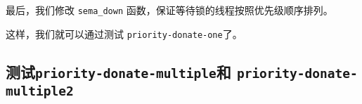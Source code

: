 \documentclass{beamer}
\begin{document}
\begin{frame}
      


\vspace{1em}



  最后，我们修改 \texttt{sema\_down} 函数，保证等待锁的线程按照优先级顺序排列。

    
    

\framebreak

  这样，我们就可以通过测试 \texttt{priority-donate-one}了。

\end{frame}

\subsection{测试\texttt{priority-donate-multiple}和 \texttt{priority-donate-multiple2}}
\end{document}
